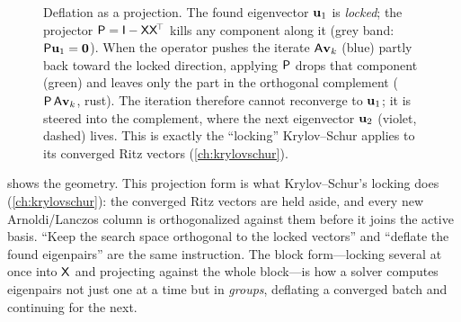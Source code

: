 \begin{figure}[t]
\centering
{}
\caption[Deflation projects the iterate off the locked directions]{Deflation as a
projection. The found eigenvector $\mathbf{u}_1$ is \emph{locked}; the projector
$\mathsf{P}=\mathsf{I}-\mathsf{X}\mathsf{X}^{\!\top}$ kills any component along it (grey band:
$\mathsf{P}\mathbf{u}_1=\mathbf 0$). When the operator pushes the iterate $\mathsf{A}\mathbf{v}_k$
(blue) partly back toward the locked direction, applying $\mathsf{P}$ drops that
component (green) and leaves only the part in the orthogonal complement
($\mathsf{P}\,\mathsf{A}\mathbf{v}_k$, rust). The iteration therefore cannot reconverge to
$\mathbf{u}_1$; it is steered into the complement, where the next eigenvector $\mathbf{u}_2$
(violet, dashed) lives. This is exactly the ``locking'' Krylov--Schur applies to
its converged Ritz vectors (\cref{ch:krylovschur}).}
\label{fig:deflate-project}
\end{figure}

 shows the geometry. This projection form is what
Krylov--Schur's locking does (\cref{ch:krylovschur}): the converged Ritz vectors
are held aside, and every new Arnoldi/Lanczos column is orthogonalized against
them before it joins the active basis. ``Keep the search space orthogonal to the
locked vectors'' and ``deflate the found eigenpairs'' are the same instruction.
The block form---locking several at once into $\mathsf{X}$ and projecting against the
whole block---is how a solver computes eigenpairs not just one at a time but in
\emph{groups}, deflating a converged batch and continuing for the next.

